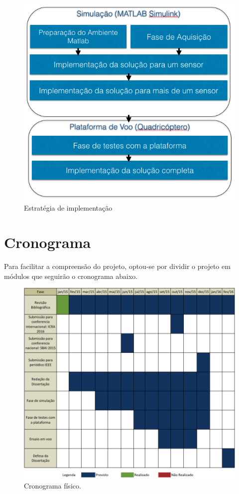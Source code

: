 \documentclass[a4paper, 12pt]{article}
\begin{document}
\begin{figure}[h]
	\centering
	\includegraphics[scale=0.5]{img/fluxo.png}
	\caption{Estratégia de implementação}
	\label{fig:Fluxo}
\end{figure}

\newpage


\section{Cronograma} 
\label{sec:crono}
Para facilitar a compreensão do projeto, optou-se por dividir o projeto em módulos que seguirão o cronograma abaixo.
\begin{figure}[h]
	\centering
		\includegraphics[scale=0.4]{img/cronograma.png}
	\caption{Cronograma físico.}
	\label{fig:cronograma}
\end{figure}
\end{document}
